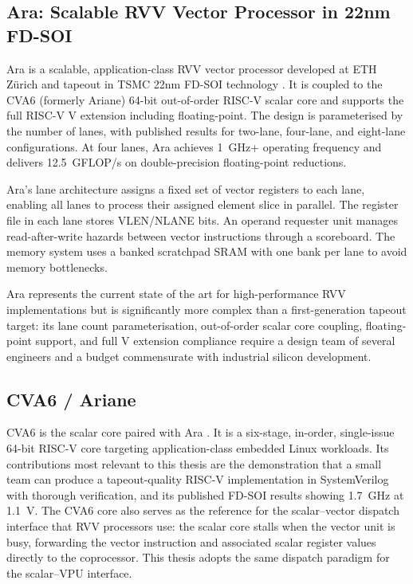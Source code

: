 \subsection{Ara: Scalable RVV Vector Processor in 22nm FD-SOI}

Ara is a scalable, application-class RVV vector processor developed at ETH Zürich and
tapeout in TSMC 22nm FD-SOI technology \cite{ara2020}. It is coupled to the CVA6
(formerly Ariane) 64-bit out-of-order RISC-V scalar core and supports the full RISC-V
V extension including floating-point. The design is parameterised by the number of
lanes, with published results for two-lane, four-lane, and eight-lane configurations.
At four lanes, Ara achieves 1~GHz+ operating frequency and delivers 12.5~GFLOP/s on
double-precision floating-point reductions.

Ara's lane architecture assigns a fixed set of vector registers to each lane, enabling
all lanes to process their assigned element slice in parallel. The register file in each
lane stores VLEN/NLANE bits. An operand requester unit manages read-after-write hazards
between vector instructions through a scoreboard. The memory system uses a banked
scratchpad SRAM with one bank per lane to avoid memory bottlenecks.

Ara represents the current state of the art for high-performance RVV implementations
but is significantly more complex than a first-generation tapeout target: its lane
count parameterisation, out-of-order scalar core coupling, floating-point support, and
full V extension compliance require a design team of several engineers and a budget
commensurate with industrial silicon development.

\subsection{CVA6 / Ariane}

CVA6 is the scalar core paired with Ara \cite{cva6}. It is a six-stage, in-order,
single-issue 64-bit RISC-V core targeting application-class embedded Linux workloads.
Its contributions most relevant to this thesis are the demonstration that a small
team can produce a tapeout-quality RISC-V implementation in SystemVerilog with thorough
verification, and its published FD-SOI results showing 1.7~GHz at 1.1~V. The CVA6
core also serves as the reference for the scalar--vector dispatch interface that RVV
processors use: the scalar core stalls when the vector unit is busy, forwarding the
vector instruction and associated scalar register values directly to the coprocessor.
This thesis adopts the same dispatch paradigm for the scalar--VPU interface.

